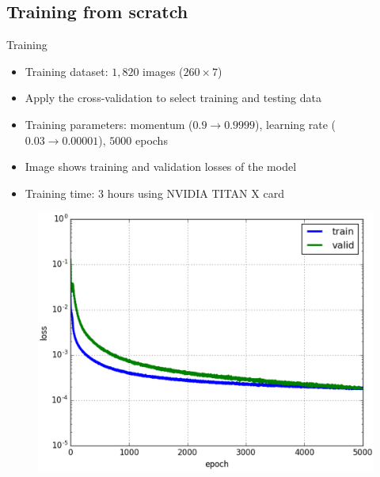 \documentclass[10pt,svgnames]{beamer}
\begin{document}
\subsection{Training from scratch}
\begin{frame}{Training}{}
	\begin{itemize}
		\item Training dataset: \textbf{$1,820$} images ($260 \times 7$)
		\item Apply the cross-validation to select training and testing data
		\item Training parameters: momentum ($0.9 \rightarrow 0.9999$), learning rate ($0.03 \rightarrow 0.00001$), $5000$ epochs\footnotemark
		\item Image shows training and validation losses of the model
		\item Training time: 3 hours using NVIDIA TITAN X card
	\end{itemize}
	\begin{center}
     \begin{figure}[htbp]
        \centering
        \includegraphics[scale=.30]{images/loss_model_3}
    	\label{figrsexample1}
	\end{figure}
  \end{center}
	
\end{frame}
\end{document}

